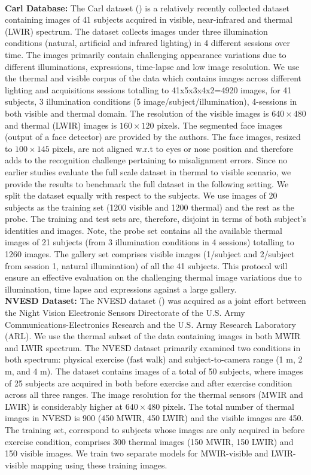 \documentclass[smallextended,natbib]{svjour3}       \usepackage{graphicx}
\begin{document}
\\[0.5\baselineskip]\noindent\textbf{Carl Database:}
The Carl dataset (\cite{carlDataset}) is a relatively recently collected dataset containing images of 41 subjects acquired in visible, near-infrared and thermal (LWIR) spectrum. The dataset collects images under three illumination conditions (natural, artificial and infrared lighting) in 4 different sessions over time. The images primarily contain challenging appearance variations due to different illuminations, expressions, time-lapse and low image resolution. We use the thermal and visible corpus of the data which contains images across different lighting and acquisitions sessions totalling to 41x5x3x4x2=4920 images, for 41 subjects, 3 illumination conditions (5 image/subject/illumination), 4-sessions in both visible and thermal domain. The resolution of the visible images is $640\times480$ and thermal (LWIR) images is $160\times120$ pixels. The segmented face images (output of a face detector) are provided by the authors. The face images, resized to $100\times145$ pixels, are not aligned w.r.t to eyes or nose position and therefore adds to the recognition challenge pertaining to misalignment errors. Since no earlier studies evaluate the full scale dataset in thermal to visible scenario, we provide the results to benchmark the full dataset in the following setting. We split the dataset equally with respect to the subjects. We use images of 20 subjects as the training set (1200 visible and 1200 thermal) and the rest as the probe. The training and test sets are, therefore, disjoint in terms of both subject's identities and images. Note, the probe set contains all the available thermal images of 21 subjects (from 3 illumination conditions in 4 sessions) totalling to 1260 images. The gallery set comprises visible images (1/subject and 2/subject from session 1, natural illumination) of all the 41 subjects. This protocol will ensure an effective evaluation on the challenging thermal image variations due to illumination, time lapse and expressions against a large gallery.
\\[0.5\baselineskip]\noindent\textbf{NVESD Dataset:}
The NVESD dataset (\cite{NVESD}) was acquired as a joint effort between the Night Vision Electronic Sensors Directorate of the U.S. Army Communications-Electronics Research and the U.S. Army Research Laboratory (ARL). We use the thermal subset of the data containing images in both MWIR and LWIR spectrum. The NVESD dataset primarily examined two conditions in both spectrum: physical exercise (fast walk) and subject-to-camera range (1 m, 2 m, and 4 m). The dataset contains images of a total of 50 subjects, where images of 25 subjects are acquired in both before exercise and after exercise condition across all three ranges. The image resolution for the thermal sensors (MWIR and LWIR) is considerably higher at $640\times480$ pixels. The total number of thermal images in NVESD is 900 (450 MWIR, 450 LWIR) and the visible images are 450. The training set,  correspond to subjects whose images are only acquired in before exercise condition,  comprises 300 thermal images (150 MWIR, 150 LWIR) and 150 visible images. We train two separate models for MWIR-visible and LWIR-visible mapping using these training images. 
\end{document}
